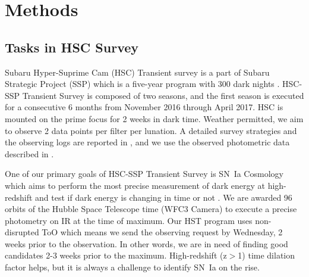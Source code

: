 \documentclass[useamsfonts]{pasj01}
\begin{document}
%
\section{Methods}
\subsection{Tasks in HSC Survey}
\label{sec:tasks}
Subaru Hyper-Suprime Cam (HSC) Transient survey is a part of Subaru Strategic Project (SSP) which is a five-year program with 300 dark nights \citep{aihara18a,miyazaki18a}.
HSC-SSP Transient Survey is composed of two seasons, and the first season is executed for a consecutive 6 months from November 2016 through April 2017.
HSC is mounted on the prime focus for 2 weeks in dark time.   
Weather permitted, we aim to observe 2 data points per filter per lunation.
A detailed survey strategies and the observing logs are reported in \citet{yasuda19a}, and we use the observed photometric data described in \citet{yasuda19a}.

One of our primary goals of HSC-SSP Transient Survey is SN~Ia Cosmology which aims to perform the most precise measurement of dark energy at high-redshift and test if dark energy is changing in time or not \citep{linder03b}.
We are awarded 96 orbits of the Hubble Space Telescope time (WFC3 Camera) to execute a precise photometry on IR at the time of maximum.
Our HST program uses non-disrupted ToO which means we send the observing request by Wednesday, 2 weeks prior to the observation.
In other words, we are in need of finding good candidates 2-3 weeks prior to the maximum.  High-redshift (z$>$1) time dilation factor helps, but it is always a challenge to identify SN~Ia on the rise.
\end{document}
